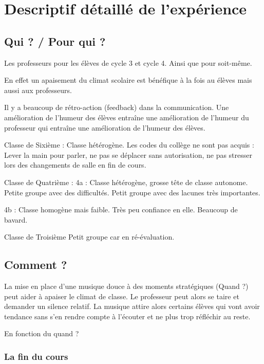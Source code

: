 \documentclass[11pt]{article}
\begin{document}
	\newpage
	
	\section{Descriptif détaillé de l'expérience}
	
	\subsection{Qui ? / Pour qui ?}
	
	Les professeurs pour les élèves de cycle 3 et cycle 4. Ainsi que pour soit-même. 
	
	En effet un apaisement du climat scolaire est bénéfique à la fois au élèves mais aussi aux professeurs. 
	
	Il y a beaucoup de rétro-action (feedback) dans la communication. Une amélioration de l'humeur des élèves entraîne une amélioration de l'humeur du professeur qui entraîne une amélioration de l'humeur des élèves.
	
	Classe de Sixième : 
	Classe hétérogène. Les codes du collège ne sont pas acquis : Lever la main pour parler, ne pas se déplacer sans autorisation, ne pas stresser lors des changements de salle en fin de cours. 
	
	Classe de Quatrième :
	4a : Classe hétérogène, grosse tête de classe autonome. Petite groupe avec des difficultés. Petit groupe avec des lacunes très importantes.
	
	4b : Classe homogène mais faible. Très peu confiance en elle. Beaucoup de bavard.
	
	Classe de Troisième
	Petit groupe car en ré-évaluation.
	
	\subsection{Comment ?}
	
	La mise en place d'une musique douce à des moments stratégiques (Quand ?) peut aider à apaiser le climat de classe. Le professeur peut alors se taire et demander un silence relatif. La musique attire alors certains élèves qui vont avoir tendance sans s'en rendre compte à l'écouter et ne plus trop réfléchir au reste.
	
	En fonction du quand ?
	
	\subsubsection{La fin du cours}
	
\end{document}
